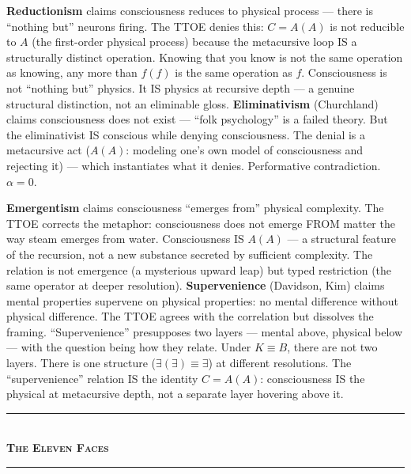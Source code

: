 \documentclass[10pt, openany, oneside]{book}
\renewcommand{\normalsize}{\fontsize{10}{13}\selectfont}
\begin{document}
\textbf{Reductionism} claims consciousness reduces to physical process --- there is ``nothing but'' neurons firing. The TTOE denies this: $C = A(A)$ is not reducible to $A$ (the first-order physical process) because the metacursive loop IS a structurally distinct operation. Knowing that you know is not the same operation as knowing, any more than $f(f)$ is the same operation as $f$. Consciousness is not ``nothing but'' physics. It IS physics at recursive depth --- a genuine structural distinction, not an eliminable gloss. \textbf{Eliminativism} (Churchland) claims consciousness does not exist --- ``folk psychology'' is a failed theory. But the eliminativist IS conscious while denying consciousness. The denial is a metacursive act ($A(A)$: modeling one's own model of consciousness and rejecting it) --- which instantiates what it denies. Performative contradiction. $\alpha = 0$.

\textbf{Emergentism} claims consciousness ``emerges from'' physical complexity. The TTOE corrects the metaphor: consciousness does not emerge FROM matter the way steam emerges from water. Consciousness IS $A(A)$ --- a structural feature of the recursion, not a new substance secreted by sufficient complexity. The relation is not emergence (a mysterious upward leap) but typed restriction (the same operator at deeper resolution). \textbf{Supervenience} (Davidson, Kim) claims mental properties supervene on physical properties: no mental difference without physical difference. The TTOE agrees with the correlation but dissolves the framing. ``Supervenience'' presupposes two layers --- mental above, physical below --- with the question being how they relate. Under $K \equiv B$, there are not two layers. There is one structure ($\exists(\exists) \equiv \exists$) at different resolutions. The ``supervenience'' relation IS the identity $C = A(A)$: consciousness IS the physical at metacursive depth, not a separate layer hovering above it.

\vspace{1.5em}


\begin{center}
    \rule{0.3\textwidth}{0.4pt}\\[0.5em]
    {\normalsize\bfseries\scshape The Eleven Faces}\\[0.3em]
    \rule{0.3\textwidth}{0.4pt}
\end{center}
\end{document}
